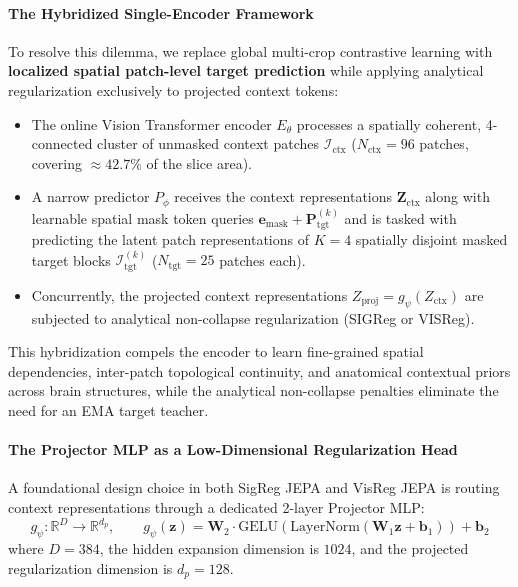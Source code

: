 \documentclass{article}
\begin{document}
\paragraph{The Hybridized Single-Encoder Framework}
To resolve this dilemma, we replace global multi-crop contrastive learning with \textbf{localized spatial patch-level target prediction} while applying analytical regularization exclusively to projected context tokens:
\begin{itemize}
    \item The online Vision Transformer encoder $E_\theta$ processes a spatially coherent, 4-connected cluster of unmasked context patches $\mathcal{I}_{\text{ctx}}$ ($N_{\text{ctx}} = 96$ patches, covering $\approx 42.7\%$ of the slice area).
    \item A narrow predictor $P_\phi$ receives the context representations $\mathbf{Z}_{\text{ctx}}$ along with learnable spatial mask token queries $\mathbf{e}_{\text{mask}} + \mathbf{P}_{\text{tgt}}^{(k)}$ and is tasked with predicting the latent patch representations of $K = 4$ spatially disjoint masked target blocks $\mathcal{I}_{\text{tgt}}^{(k)}$ ($N_{\text{tgt}} = 25$ patches each).
    \item Concurrently, the projected context representations $Z_{\text{proj}} = g_\psi(Z_{\text{ctx}})$ are subjected to analytical non-collapse regularization (SIGReg or VISReg).
\end{itemize}
This hybridization compels the encoder to learn fine-grained spatial dependencies, inter-patch topological continuity, and anatomical contextual priors across brain structures, while the analytical non-collapse penalties eliminate the need for an EMA target teacher.

\paragraph{The Projector MLP as a Low-Dimensional Regularization Head}
A foundational design choice in both SigReg JEPA and VisReg JEPA is routing context representations through a dedicated 2-layer Projector MLP:
\begin{equation}
    g_\psi: \mathbb{R}^{D} \to \mathbb{R}^{d_p}, \qquad g_\psi(\mathbf{z}) = \mathbf{W}_2 \cdot \text{GELU}\left(\text{LayerNorm}\left(\mathbf{W}_1 \mathbf{z} + \mathbf{b}_1\right)\right) + \mathbf{b}_2
\end{equation}
where $D = 384$, the hidden expansion dimension is $1024$, and the projected regularization dimension is $d_p = 128$. 
\end{document}
